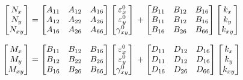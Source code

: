 \documentclass[smallextended]{svjour3}       %
\begin{document}
\begin{equation}
	\begin{bmatrix}
		N_x \\
		N_y \\
		N_{xy}
	\end{bmatrix}
	=
	\begin{bmatrix}
		A_{11} & A_{12} & A_{16} \\
		A_{12} & A_{22} & A_{26} \\
		A_{16} & A_{26} & A_{66} 
	\end{bmatrix}
    \begin{bmatrix}
		\varepsilon_x^0 \\
        \varepsilon_y^0 \\
		\gamma_{xy}^0
    \end{bmatrix} \\
	+
	\begin{bmatrix}
		B_{11} & B_{12} & B_{16} \\
		B_{11} & B_{12} & B_{16} \\
		B_{16} & B_{26} & B_{66} 
	\end{bmatrix}
	\begin{bmatrix}
		k_x \\
		k_y \\
		k_{xy} 
	\end{bmatrix}
\end{equation}

\begin{equation*}
	\begin{bmatrix}
		M_x \\
		M_y \\
		M_{xy}
	\end{bmatrix}
	=
	\begin{bmatrix}
		B_{11} & B_{12} & B_{16} \\
		B_{12} & B_{22} & B_{26} \\
		B_{16} & B_{26} & B_{66} 
	\end{bmatrix}
    \begin{bmatrix}
		\varepsilon_x^0 \\
        \varepsilon_y^0 \\
		\gamma_{xy}^0
    \end{bmatrix} \\
	+
	\begin{bmatrix}
		D_{11} & D_{12} & D_{16} \\
		D_{11} & D_{12} & D_{16} \\
		D_{16} & D_{26} & D_{66} 
	\end{bmatrix}
	\begin{bmatrix}
		k_x \\
		k_y \\
		k_{xy} 
	\end{bmatrix}
\end{equation*}
\end{document}
